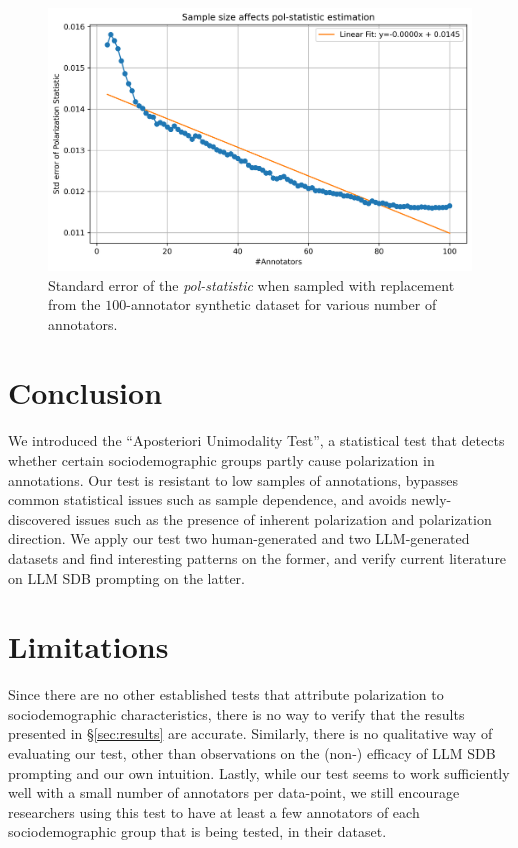 \documentclass[twocolumn, 8pt]{article}
\begin{document}
\begin{figure}
	\includegraphics[width=\linewidth]{ndfu_std_error_sample_size.png}
	\caption{Standard error of the \textit{pol-statistic} when sampled with replacement from the $100$-annotator synthetic dataset for various number of annotators.}
	\label{fig::std_error}
\end{figure}


\section{Conclusion}

We introduced the ``Aposteriori Unimodality Test'', a statistical test that detects whether certain sociodemographic groups partly cause polarization in annotations. Our test is resistant to low samples of annotations, bypasses common statistical issues such as sample dependence, and avoids newly-discovered issues such as the presence of inherent polarization and polarization direction. We apply our test two human-generated and two \ac{LLM}-generated datasets and find interesting patterns on the former, and verify current literature on \ac{LLM} \ac{SDB} prompting on the latter.


\section{Limitations}

Since there are no other established tests that attribute polarization to sociodemographic characteristics, there is no way to verify that the results presented in \S\ref{sec:results} are accurate. Similarly, there is no qualitative way of evaluating our test, other than observations on the (non-) efficacy of \ac{LLM} {SDB} prompting and our own intuition. Lastly, while our test seems to work sufficiently well with a small number of annotators per data-point, we still encourage researchers using this test to have at least a few annotators of each sociodemographic group that is being tested, in their dataset.
\end{document}
